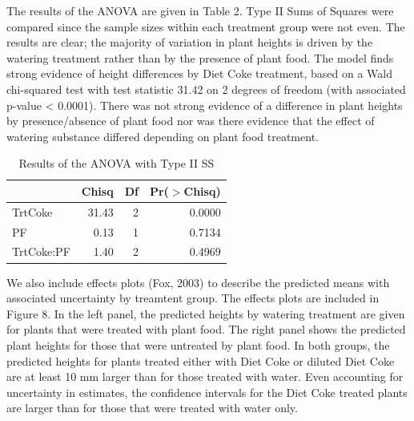 \documentclass[1p,12pt]{elsarticle}\usepackage[]{graphicx}\usepackage[]{color}
\begin{document}
The results of the ANOVA are given in Table 2. Type II Sums of Squares were compared since the sample sizes within each treatment group were not even.  The results are clear; the majority of variation in plant heights is driven by the watering treatment rather than by the presence of plant food.  The model finds strong evidence of height differences by Diet Coke treatment, based on a Wald chi-squared test with test statistic 31.42 on 2 degrees of freedom (with associated p-value < 0.0001). There was not strong evidence of a difference in plant heights by presence/absence of plant food nor was there evidence that the effect of watering substance differed depending on plant food treatment. 

\begin{table}[ht]
\centering
\begin{tabular}{lrrr}
  \hline
 & Chisq & Df & Pr($>$Chisq) \\ 
  \hline
TrtCoke & 31.43 & 2 & 0.0000 \\ 
  PF & 0.13 & 1 & 0.7134 \\ 
  TrtCoke:PF & 1.40 & 2 & 0.4969 \\ 
   \hline
\end{tabular}
\caption{Results of the ANOVA with Type II SS}
\end{table}
 

We also include effects plots (Fox, 2003) to describe the predicted means with associated uncertainty by treamtent group. The effects plots are included in Figure 8. In the left panel, the predicted heights by watering treatment are given for plants that were treated with plant food. The right panel shows the predicted plant heights for those that were untreated by plant food. In both groups, the predicted heights for plants treated either with Diet Coke or diluted Diet Coke are at least 10 mm larger than for those treated with water. Even accounting for uncertainty in estimates, the confidence intervals for the Diet Coke treated plants are larger than for those that were treated with water only.  
\end{document}
